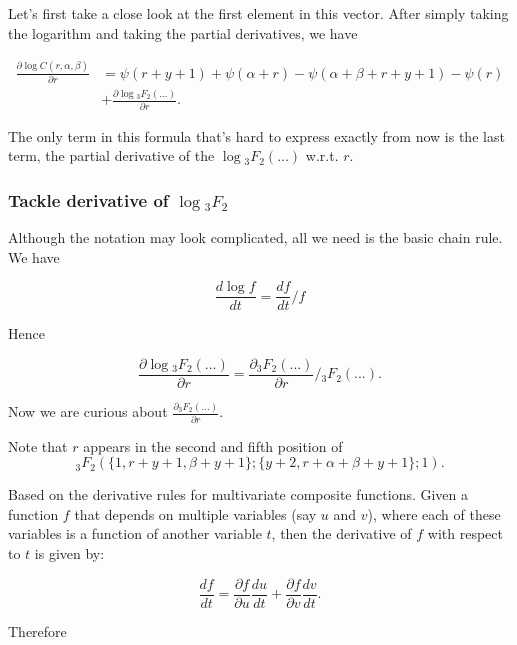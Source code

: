 \documentclass[11pt]{article}
\begin{document}
Let's first take a close look at the first element in this vector. After simply taking the logarithm and taking the partial derivatives, we have

\begin{equation}
\begin{aligned}
\frac{\partial \log C(r,\alpha,\beta)}{\partial r} &= \psi(r+y+1) + \psi(\alpha+r) - \psi(\alpha+\beta+r+y+1) - \psi(r) \\
&+ \frac{\partial \log {}_3F_2(...)}{\partial r}.
\end{aligned}
\end{equation}

The only term in this formula that's hard to express exactly from now is the last term, the partial derivative of the $\log {}_3F_2(...)$ w.r.t. $r$.

\subsubsection*{Tackle derivative of $\log {}_3F_2$}
Although the notation may look complicated, all we need is the basic chain rule. We have

\begin{equation}
	\frac{d \log f}{dt} = \frac{df}{dt} / f
\end{equation}

Hence

\begin{equation}
	\frac{\partial \log {}_3F_2(...)}{\partial r} =  \frac{\partial {}_3F_2(...)}{\partial r} /  {}_3F_2(...).
\end{equation}

Now we are curious about $\frac{\partial {}_3F_2(...)}{\partial r}$.

Note that $r$ appears in the second and fifth position of $${}_3F_2(\{1,r+y +1,\beta +y +1\}; \{y +2,r+\alpha +\beta +y +1\};1).$$

Based on the derivative rules for multivariate composite functions. Given a function \( f \) that depends on multiple variables (say \( u \) and \( v \)), where each of these variables is a function of another variable \( t \), then the derivative of \( f \) with respect to \( t \) is given by:

\begin{equation}
	\frac{df}{dt} = \frac{\partial f}{\partial u} \frac{du}{dt} + \frac{\partial f}{\partial v} \frac{dv}{dt}.
\end{equation}

Therefore
\end{document}
